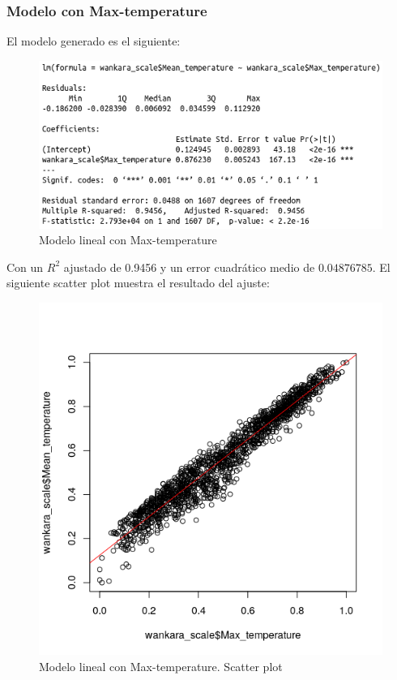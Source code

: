 \subsubsection{Modelo con Max-temperature}

El modelo generado es el siguiente:

\begin{figure}[H] %
	\centering
	\includegraphics[scale=0.735]{lm1.png}  %
	\caption{Modelo lineal con Max-temperature} 
	\label{fig:lm1}
\end{figure}

Con un $R^2$ ajustado de 0.9456 y un error cuadrático medio de $0.04876785$. El siguiente scatter plot muestra el resultado del ajuste:

\begin{figure}[H] %
	\centering
	\includegraphics[scale=0.735]{plot1.png}  %
	\caption{Modelo lineal con Max-temperature. Scatter plot} 
	\label{fig:plot1}
\end{figure}

